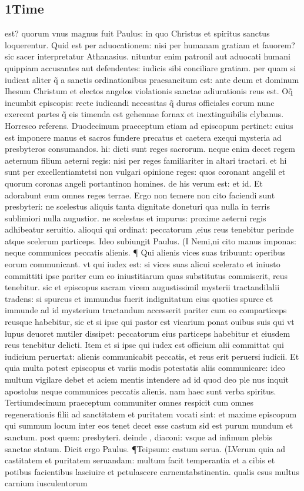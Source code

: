 \documentclass{article}
\begin{document}
\begin{pages}
\section*{1Time }
\marginpar{[ p.210 ]}\pstart est? quorum vnus magnus fuit Paulus: in quo Christus et spiritus sanctus loquerentur. Quid est per aduocationem: nisi per humanam gratiam et fauorem? sic sacer interpretatur Athanasius. nituntur enim patronil aut aduocati humani quippiam accusantes aut defendentes: iudicis sibi conciliare gratiam. per quam si iudicat aliter q̃ a sanctis ordinationibus praesancitum est: ante deum et dominum Ihesum Christum et electos angelos  violationis sanctae adiurationis reus est. Oq̃ incumbit episcopis: recte iudicandi necessitas q̃ duras officiales eorum nunc exercent partes q̃ eis timenda est gehennae fornax et inextinguibilis clybanus. Horresco referens. Duodecimum praeceptum etiam ad episcopum pertinet: cuius est imponere manus et sacros fundere precatus et caetera exequi mysteria ad presbyteros consumandos. hi: dicti sunt reges sacrorum. neque enim decet regem aeternum filium aeterni regis: nisi per reges familiariter in altari tractari. et hi sunt per excellentiamtetsi non vulgari opinione reges: quos coronant angelil et quorum coronas angeli portantinon homines. de his verum est: et id. Et adorabunt eum omnes reges terrae. Ergo non temere non cito faciendi sunt presbyteri: ne scelestus aliquis tanta dignitate doneturi qua nulla in terris sublimiori nulla augustior. ne scelestus et impurus: proxime aeterni regis adhibeatur seruitio. alioqui qui ordinat: peccatorum ,eius reus tenebitur perinde atque scelerum particeps. Ideo subiungit Paulus. (I Nemi,ni cito manus imponas: neque communices peccatis alienis. ¶ Qui alienis vices suas tribuunt: operibus eorum communicant. vt qui iudex est: si vices suas alicui scelerato et iniusto committiti ipse pariter cum eo iniustitiarum quas substitutus commiserit, reus tenebitur. sic et episcopus sacram vicem augustissimil mysterii tractandilalii tradens: si spurcus et immundus fuerit indignitatum eius quoties spurce et immunde ad id mysterium tractandum accesserit pariter cum eo comparticeps reusque habebitur, sic et si ipse qui pastor est vicarium ponat ouibus suis qui vt lupus deuoret mutiler dissipet: peccatorum eius particeps habebitur et eiusdem reus tenebitur delicti. Item et si ipse qui iudex est officium alii committat qui iudicium peruertat: alienis communicabit peccatis, et reus erit peruersi iudicii. Et quia multa potest episcopus et variis modis potestatis aliis communicare: ideo multum vigilare debet et aciem mentis intendere ad id quod deo ple nus inquit apostolus neque communices peccatis alienis. nam haec sunt verba spiritus. Tertiumdecimum praeceptum communiter omnes respicit cum omnes regenerationis filii ad sanctitatem et puritatem vocati sint: et maxime episcopum qui summum locum inter eos tenet decet esse castum sid est purum mundum et sanctum. post quem: presbyteri. deinde , diaconi: vsque ad infimum plebis sanctae statum. Dicit ergo Paulus. ¶Teipsum: castum serua. (LVerum quia ad castitatem et puritatem seruandam: multum facit temperantia  et a cibis et potibus facientibus lasciuire et petulascere carnemtabstinentia. qualis esus multus carnium iusculentorum 
\end{pages}
\end{document}
